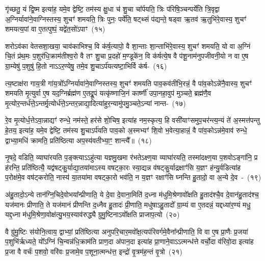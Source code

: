 गृ॑च्छतु॒ यं द्वि॒ष्म इत्या॑ह॒ यमे॒व द्वेष्टि॒ तम॑स्य क्षु॒धा च॑ शु॒चा चा᳚र्पयति॒ त्रिः प॑रिषि॒ञ्चन्पर्ये॑ति त्रि॒वृद्वा अ॒ग्निर्यावा॑ने॒वाग्निस्तस्य॒ शुचꣳ॑ शमयति॒ त्रिः पुनः॒ पर्ये॑ति॒ षट्थ्सं प॑द्यन्ते॒ षड्वा ऋ॒तव॑ ऋ॒तुभि॑रे॒वास्य॒ शुचꣳ॑ शमयत्य॒पां वा ए॒तत्पुष्पं॒ यद्वे॑त॒सो॑\-ऽपाꣳ~(१५)\ip

शरो\-ऽव॑का वेतसशा॒खया॒ चाव॑काभिश्च॒ वि क॑र्\mbox{}ष॒त्यापो॒ वै शा॒न्ताः शा॒न्ताभि॑रे॒वास्य॒ शुचꣳ॑ शमयति॒ यो वा अ॒ग्निं चि॒तं प्र॑थ॒मः प॒शुर॑धि॒क्राम॑तीश्व॒रो वै तꣳ शु॒चा प्र॒दहो॑ म॒ण्डूके॑न॒ वि क॑र्\mbox{}षत्ये॒ष वै प॑शू॒नाम॑नुपजीवनी॒यो न वा ए॒ष ग्रा॒म्येषु॑ प॒शुषु॑ हि॒तो ना\-ऽऽर॒ण्येषु॒ तमे॒व शु॒चा\-ऽर्प॑यत्यष्टा॒भिर्वि क॑र्\mbox{}ष-~(१६)\ip

त्य॒ष्टाक्ष॑रा गाय॒त्री गा॑य॒त्रो᳚\-ऽग्निर्यावा॑ने॒वाग्निस्तस्य॒ शुचꣳ॑ शमयति पाव॒कव॑तीभि॒रन्नं॒ वै पा॑व॒को\-ऽन्ने॑नै॒वास्य॒ शुचꣳ॑ शमयति मृ॒त्युर्वा ए॒ष यद॒ग्निर्ब्रह्म॑ण ए॒तद्रू॒पं यत्कृ॑ष्णाजि॒नं कार्\mbox{}ष्णी॑ उपा॒नहा॒वुप॑ मुञ्चते॒ ब्रह्म॑णै॒व मृ॒त्योर॒न्तर्ध॑त्ते॒\-ऽन्तर्मृ॒त्योर्ध॑त्ते॒\-ऽन्तर॒न्नाद्या॒दित्या॑हुर॒न्यामु॑पमु॒ञ्चते॒\-ऽन्यां नान्त-~(१७)\ip

रे॒व मृ॒त्योर्ध॒त्ते\-ऽवा॒न्नाद्यꣳ॑ रुन्धे॒ नम॑स्ते॒ हर॑से शो॒चिष॒ इत्या॑ह नम॒स्कृत्य॒ हि वसी॑याꣳसमुप॒चर॑न्त्य॒न्यं ते॑ अ॒स्मत्त॑पन्तु हे॒तय॒ इत्या॑ह॒ यमे॒व द्वेष्टि॒ तम॑स्य शु॒चा\-ऽर्प॑यति पाव॒को अ॒स्मभ्यꣳ॑ शि॒वो भ॒वेत्या॒हान्नं॒ वै पा॑व॒को\-ऽन्न॑मे॒वाव॑ रुन्धे॒ द्वाभ्या॒मधि॑ क्रामति॒ प्रति॑ष्ठित्या अप॒स्य॑वतीभ्या॒ꣳ॒ शान्त्यै᳚॥~(१८)\ip

{\anuvakamend[{शुग्वे॑त॒सो॑\-ऽपाम॑ष्टा॒भिर्विक॑र्\mbox{}षति॒ नान्तरेका॒न्नप॑ञ्चा॒शच्च॑}]}

नृ॒षदे॒ वडिति॒ व्याघा॑रयति प॒ङ्क्त्या\-ऽऽहु॑त्या यज्ञमु॒खमा र॑भते\-ऽक्ष्ण॒या व्याघा॑रयति॒ तस्मा॑दक्ष्ण॒या प॒शवो\-ऽङ्गा॑नि॒ प्र ह॑रन्ति॒ प्रति॑ष्ठित्यै॒ यद्व॑षट्कु॒र्याद्या॒तया॑मा\-ऽस्य वषट्का॒रः स्या॒द्यन्न व॑षट्कु॒र्याद्रक्षाꣳ॑सि य॒ज्ञꣳ ह॑न्यु॒र्वडित्या॑ह प॒रोक्ष॑मे॒व वष॑ट्करोति॒ नास्य॑ या॒तया॑मा वषट्का॒रो भव॑ति॒ न य॒ज्ञꣳ रक्षाꣳ॑सि घ्नन्ति हु॒तादो॒ वा अ॒न्ये दे॒व~-~(१९)\ip

अ॑हु॒तादो॒\-ऽन्ये तान॑ग्नि॒चिदे॒वोभया᳚न्प्रीणाति॒ ये दे॒वा दे॒वाना॒मिति॑ द॒ध्ना म॑धुमि॒श्रेणावो᳚क्षति हु॒ताद॑श्चै॒व दे॒वान॑हु॒ताद॑श्च॒ यज॑मानः प्रीणाति॒ ते यज॑मानं प्रीणन्ति द॒ध्नैव हु॒तादः॑ प्री॒णाति॒ मधु॑षा\-ऽहु॒तादो᳚ ग्रा॒म्यं वा ए॒तदन्नं॒ यद्दध्या॑र॒ण्यं मधु॒ यद्द॒ध्ना म॑धुमि॒श्रेणा॒वोक्ष॑त्यु॒भय॒स्याव॑रुद्ध्यै ग्रुमु॒ष्टिना\-ऽवो᳚क्षति प्राजाप॒त्यो~(२०)\ip

वै ग्रु॑मु॒ष्टिः स॑योनि॒त्वाय॒ द्वाभ्यां॒ प्रति॑ष्ठित्या अनुपरि॒चार॒मवो᳚क्ष॒त्यप॑रिवर्गमे॒वैना᳚न्प्रीणाति॒ वि वा ए॒ष प्रा॒णैः प्र॒जया॑ प॒शुभि॑र्\mbox{}ऋध्यते॒ यो᳚\-ऽग्निं चि॒न्वन्न॑धि॒क्राम॑ति प्राण॒दा अ॑पान॒दा इत्या॑ह प्रा॒णाने॒वा\-ऽऽ\-त्मन्ध॑त्ते वर्चो॒दा व॑रिवो॒दा इत्या॑ह प्र॒जा वै वर्चः॑ प॒शवो॒ वरि॑वः प्र॒जामे॒व प॒शूना॒त्मन्ध॑त्त॒ इन्द्रो॑ वृ॒त्रम॑ह॒न्तं वृ॒त्रो~(२१)\ip

